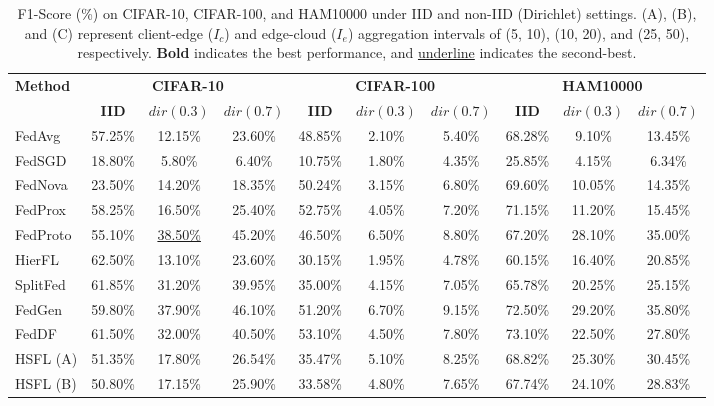 \begin{table}
    \centering
    \caption{F1-Score (\%) on CIFAR-10, CIFAR-100, and HAM10000 under IID and non-IID (Dirichlet) settings. (A), (B), and (C) represent client-edge ($I_c$) and edge-cloud ($I_e$) aggregation intervals of (5, 10), (10, 20), and (25, 50), respectively. \textbf{Bold} indicates the best performance, and \underline{underline} indicates the second-best.}
    \begin{tabular}{l|ccc|ccc|ccc}
        \hline
        \multirow{2}{*}{\textbf{Method}} &
        \multicolumn{3}{c|}{\textbf{CIFAR-10}} &
        \multicolumn{3}{c|}{\textbf{CIFAR-100}} &
        \multicolumn{3}{c}{\textbf{HAM10000}} \\
        \cline{2-10}
        & \textbf{IID} & $dir(0.3)$ & $dir(0.7)$ & \textbf{IID} & $dir(0.3)$ & $dir(0.7)$ & \textbf{IID} & $dir(0.3)$ & $dir(0.7)$ \\
        \hline
        FedAvg & 57.25\% & 12.15\% & 23.60\% & 48.85\% & 2.10\% & 5.40\% & 68.28\% & 9.10\% & 13.45\%\\
        FedSGD & 18.80\% & 5.80\% & 6.40\% & 10.75\% & 1.80\% & 4.35\% & 25.85\% & 4.15\% & 6.34\%\\
        FedNova & 23.50\% & 14.20\% & 18.35\% & 50.24\% & 3.15\% & 6.80\% & 69.60\% & 10.05\% & 14.35\%\\
        FedProx & 58.25\% & 16.50\% & 25.40\% & 52.75\% & 4.05\% & 7.20\% & 71.15\% & 11.20\% & 15.45\%\\
        \hline
        FedProto & 55.10\% & \underline{38.50\%} & 45.20\% & 46.50\% & 6.50\% & 8.80\% & 67.20\% & 28.10\% & 35.00\%\\
        \hline
        HierFL & 62.50\% & 13.10\% & 23.60\% & 30.15\% & 1.95\% & 4.78\% & 60.15\% & 16.40\% & 20.85\%\\
        \hline
        SplitFed & 61.85\% & 31.20\% & 39.95\% & 35.00\% & 4.15\% & 7.05\% & 65.78\% & 20.25\% & 25.15\%\\
        \hline
        FedGen & 59.80\% & 37.90\% & 46.10\% & 51.20\% & 6.70\% & 9.15\% & 72.50\% & 29.20\% & 35.80\%\\
        FedDF & 61.50\% & 32.00\% & 40.50\% & 53.10\% & 4.50\% & 7.80\% & 73.10\% & 22.50\% & 27.80\% \\
        \hline
        HSFL (A) & 51.35\% & 17.80\% & 26.54\% & 35.47\% & 5.10\% & 8.25\% & 68.82\% & 25.30\% & 30.45\%\\
        HSFL (B) & 50.80\% & 17.15\% & 25.90\% & 33.58\% & 4.80\% & 7.65\% & 67.74\% & 24.10\% & 28.83\%\\

\end{tabular}
\end{table}
